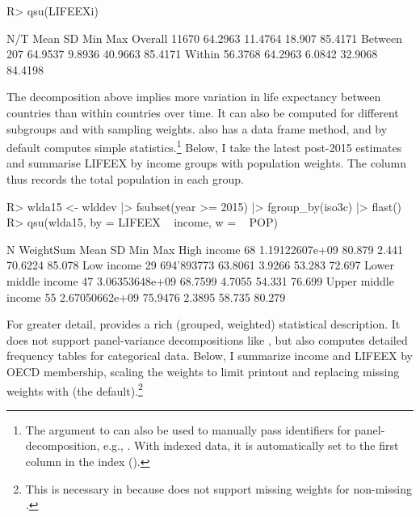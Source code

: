 \documentclass[article]{jss} %
\newcommand{\fct}[1]{\code{#1()}}
\begin{document}
%
\begin{Schunk}
\begin{Sinput}
R> qsu(LIFEEXi)
\end{Sinput}
\begin{Soutput}
             N/T     Mean       SD      Min      Max
Overall    11670  64.2963  11.4764   18.907  85.4171
Between      207  64.9537   9.8936  40.9663  85.4171
Within   56.3768  64.2963   6.0842  32.9068  84.4198
\end{Soutput}
\end{Schunk}
%
The decomposition above implies more variation in life expectancy between countries than within countries over time. It can also be computed for different subgroups and with sampling weights. \fct{qsu} also has a data frame method, and by default computes simple statistics.\footnote{The  argument to \fct{qsu} can also be used to manually pass identifiers for panel-decomposition, e.g., . With indexed data, it is automatically set to the first column in the index ().} Below, I take the latest post-2015 estimates and summarise LIFEEX by income groups with population weights. The  column thus records the total population in each group.
%
\begin{Schunk}
\begin{Sinput}
R> wlda15 <- wlddev |> fsubset(year >= 2015) |> fgroup_by(iso3c) |> flast()
R> qsu(wlda15, by = LIFEEX ~ income, w = ~ POP)
\end{Sinput}
\begin{Soutput}
                      N       WeightSum     Mean      SD      Min     Max
High income          68  1.19122607e+09   80.879   2.441  70.6224  85.078
Low income           29      694'893773  63.8061  3.9266   53.283  72.697
Lower middle income  47  3.06353648e+09  68.7599  4.7055   54.331  76.699
Upper middle income  55  2.67050662e+09  75.9476  2.3895   58.735  80.279
\end{Soutput}
\end{Schunk}
%
For greater detail, \fct{descr} provides a rich (grouped, weighted) statistical description. It does not support panel-variance decompositions like \fct{qsu}, but also computes detailed frequency tables for categorical data. Below, I summarize income and LIFEEX by OECD membership, scaling the weights to limit printout and replacing missing weights with  (the default).\footnote{This is necessary in \fct{descr} because \fct{fquantile} does not support missing weights for non-missing .\vspace{-5mm}}
\end{document}
